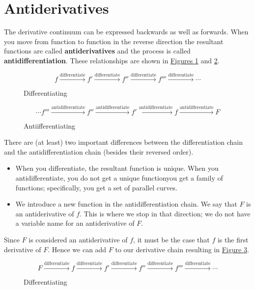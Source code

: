 \documentclass[10pt,oneside,]{book}
\newcommand{\terminology}[1]{\textbf{#1}}
\theoremstyle{plain}
\theoremstyle{definition}
\numberwithin{equation}{section}
\newcommand{\fd}[1]{#1'}
\newcommand{\sd}[1]{#1''}
\newcommand{\td}[1]{#1'''}
\begin{document}
\section[Antiderivatives]{Antiderivatives}\label{section-antiderivatives}
The derivative continuum can be expressed backwards as well as forwards.  When you move from function to function in the reverse direction the resultant functions are called \terminology{antiderivatives} and the process is called \terminology{antidifferentiation}.  These relationships are shown in \hyperref[figure-derivative-chain]{Figures \ref{figure-derivative-chain}} and \hyperref[figure-antiderivative-chain]{\ref{figure-antiderivative-chain}}.%
\begin{figure}
\centering
\[f\xrightarrow{\text{differentiate}}\fd{f}\xrightarrow{\text{differentiate}}\sd{f}\xrightarrow{\text{differentiate}}\td{f}\xrightarrow{\text{differentiate}}\cdots\]%
\caption{Differentiating\label{figure-derivative-chain}}
\end{figure}
\begin{figure}
\centering
\[\cdots\td{f}\xrightarrow{\text{antidifferentiate}}\sd{f}\xrightarrow{\text{antidifferentiate}}\fd{f}\xrightarrow{\text{antidifferentiate}}f\xrightarrow{\text{antidifferentiate}}F\]%
\caption{Antiifferentiating\label{figure-antiderivative-chain}}
\end{figure}
\par
There are (at least) two important differences between the differentiation chain and the antidifferentiation chain (besides their reversed order).%
\begin{itemize}[label=\textbullet]
\item{}When you differentiate, the resultant function is unique. When you antidifferentiate, you do not get a unique function\textemdash{}you get a family of functions; specifically, you get a set of parallel curves.\item{}We introduce a new function in the antidifferentiation chain. We say that \(F\) is an antiderivative of \(f\).  This is where we stop in that direction; we do not have a variable name for an antiderivative of \(F\).\end{itemize}
\par
Since \(F\) is considered an antiderivative of \(f\), it must be the case that \(f\) is the first derivative of \(F\). Hence we can add \(F\) to our derivative chain resulting in \hyperref[figure-longer-derivative-chain]{Figure \ref{figure-longer-derivative-chain}}.%
\begin{figure}
\centering
\[F\xrightarrow{\text{differentiate}}f\xrightarrow{\text{differentiate}}\fd{f}\xrightarrow{\text{differentiate}}\sd{f}\xrightarrow{\text{differentiate}}\td{f}\xrightarrow{\text{differentiate}}\cdots\]%
\caption{Differentiating\label{figure-longer-derivative-chain}}
\end{figure}
\typeout{************************************************}
\typeout{************************************************}
\end{document}
